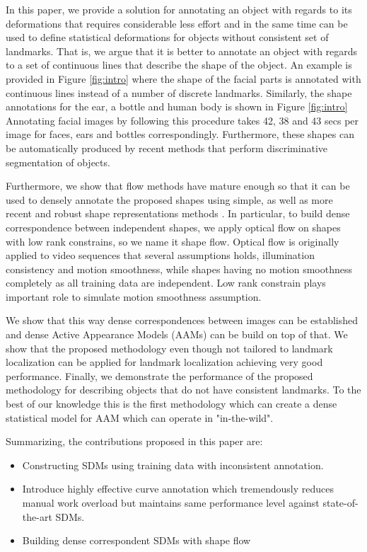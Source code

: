 In this paper, we provide a solution for annotating an object with regards to its deformations that requires considerable less effort and in the same time can be used to define statistical deformations for objects without consistent set of landmarks. That is, we argue that it is better to annotate an object with regards to a set of continuous lines that describe the shape of the object. An example is provided in Figure \ref{fig:intro} where the shape of the facial parts is annotated with continuous lines instead of a number of discrete landmarks. Similarly, the shape annotations for the ear, a bottle and human body is shown in Figure \ref{fig:intro} Annotating facial images by following this procedure takes 42, 38 and 43 secs per image for faces, ears and bottles correspondingly. Furthermore, these shapes can be automatically produced by recent methods that perform discriminative segmentation of objects.

Furthermore, we show that flow methods have mature enough so that it can be used to densely annotate the proposed shapes using simple, as well as more recent and robust shape representations methods \cite{Garg:2013hu,Nguyen2013}.  In particular, to build dense correspondence between independent shapes, we apply optical flow on shapes with low rank constrains, so we name it shape flow. Optical flow is originally applied to video sequences that several assumptions holds, illumination consistency and motion smoothness, while shapes having no motion smoothness completely as all training data are independent. Low rank constrain plays important role to simulate motion smoothness assumption.

We show that this way dense correspondences between images can be established and dense Active Appearance Models (AAMs) can be build on top of that. We show that the proposed methodology even though not tailored to landmark localization can be applied for landmark localization achieving very good performance. Finally, we demonstrate the performance of the proposed methodology for describing objects that do not have consistent landmarks. To the best of our knowledge this is the first methodology which can create a dense statistical model for AAM which can operate in "in-the-wild".



Summarizing, the contributions proposed in this paper are:
\begin{itemize}
  \item Constructing SDMs using training data with inconsistent annotation.
  \item Introduce highly effective curve annotation which tremendously reduces manual work overload but maintains same performance level against state-of-the-art SDMs.
  \item Building dense correspondent SDMs with shape flow
\end{itemize}

